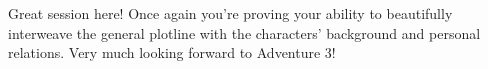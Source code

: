 Great session here! Once again you're proving your ability to beautifully interweave the general plotline with the characters' background and personal relations. Very much looking forward to Adventure 3!\\

